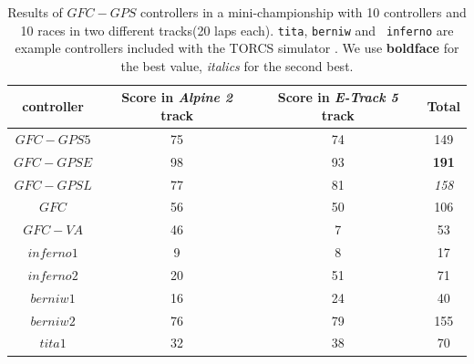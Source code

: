 \documentclass[10pt,journal,compsoc]{IEEEtran}
\begin{document}
\begin{table}[ht]
	\centering
	{\scriptsize
		\caption{ Results of $GFC-GPS$ controllers in a mini-championship with 10 controllers and 10
			races in two different tracks(20 laps each). {\tt tita}, {\tt berniw} and {\tt
				inferno} are example controllers included with the TORCS
			simulator \cite{torcs4}. We use {\bf boldface}
                      for the best value, {\em italics} for the second
                    best. }
		{
			\begin{tabular}{|c|c|c||c|}
				\hline
				controller&Score in \textit{Alpine 2} track &Score in \textit{E-Track 5} track &Total\\
				\hline
				\hline
				
			$GFC-GPS5$\cite{DBLP:conf/cig/SalemMG19}&	75	&74&	149\\
			$GFC-GPSE$&	98	&93&	{\bf 191}\\
			$GFC-GPSL$\cite{DBLP:conf/cig/SalemMG19}&	77	&81&	{\em 158}\\
			$GFC$ \cite{salem_cig2018}	&	56	&50&	106\\
			$GFC-VA$\cite{DBLP:conf/cig/SalemMG19}	&	46	&7&		53\\
			$inferno1$&	9	&8&		17\\
			$inferno2$&		20	&51&	71\\
			$berniw1$&	16	&24&	40\\
			$berniw2$&	76	&79&	155\\
			$tita1$&32	&38&	70\\		
				\hline
				
			\end{tabular}
		}\label{tab:RSresults}
	}
\end{table}
%
\end{document}
